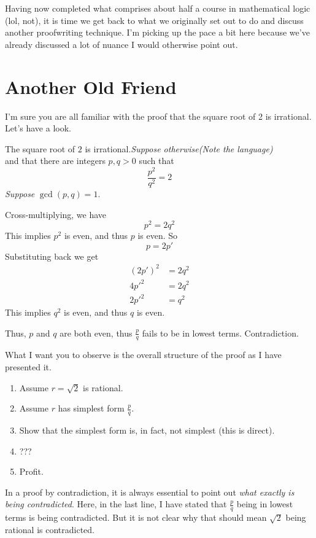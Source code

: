 

Having now completed what comprises about half a course in mathematical logic (lol, not), it is time we get back to what we originally set out to do and discuss another proofwriting technique. I'm picking up the pace a bit here because we've already discussed a lot of nuance I would otherwise point out.

\section*{Another Old Friend}
I'm sure you are all familiar with the proof that the square root of 2 is irrational. Let's have a look.

\begin{SWP}{\thm}{The square root of $2$ is irrational.}\textit{Suppose otherwise}\hfill{\footnotesize\itshape(Note the language)}\\
and that there are integers $p, q > 0$ such that
$$
\dfrac{p^2}{q^2} = 2
$$
\textit{Suppose} $\gcd (p, q) = 1$.

Cross-multiplying, we have
$$
p^2 = 2q^2
$$
This implies $p^2$ is even, and thus $p$ is even. So
$$
p = 2p'
$$
Substituting back we get
\begin{align*}
(2p')^2 &= 2q^2 \\
4{p'}^2 &= 2q^2 \\
2{p'}^2 &= q^2
\end{align*}
This implies $q^2$ is even, and thus $q$ is even.

Thus, $p$ and $q$ are both even, thus $\frac p q$ fails to be in lowest terms. Contradiction.
\end{SWP}

What I want you to observe is the overall structure of the proof as I have presented it.
\begin{enumerate}
    \item Assume $r = \sqrt 2$ is rational.
    \item Assume $r$ has simplest form $\frac p q$.
    \item Show that the simplest form is, in fact, not simplest (this is direct).
    \item ???
    \item Profit.
\end{enumerate}

In a proof by contradiction, it is always essential to point out \textit{what exactly is being contradicted}. Here, in the last line, I have stated that $\frac p q$ being in lowest terms is being contradicted. But it is not clear why that should mean $\sqrt 2$ being rational is contradicted.


